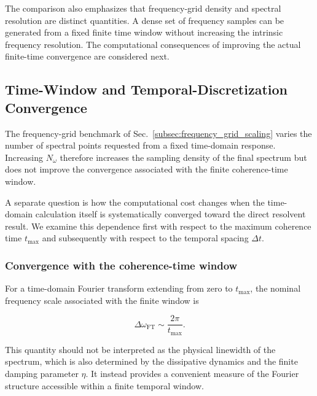 \documentclass[11pt]{article}
\begin{document}
The comparison also emphasizes that frequency-grid density and
spectral resolution are distinct quantities.  A dense set of
frequency samples can be generated from a fixed finite time window
without increasing the intrinsic frequency resolution.  The
computational consequences of improving the actual finite-time
convergence are considered next.

\subsection{Time-Window and Temporal-Discretization Convergence}
\label{subsec:time_window_scaling}

The frequency-grid benchmark of
Sec.~\ref{subsec:frequency_grid_scaling} varies the number of spectral
points requested from a fixed time-domain response.  Increasing
$N_\omega$ therefore increases the sampling density of the final
spectrum but does not improve the convergence associated with the
finite coherence-time window.

A separate question is how the computational cost changes when the
time-domain calculation itself is systematically converged toward the
direct resolvent result.  We examine this dependence first with respect
to the maximum coherence time $t_{\max}$ and subsequently with respect
to the temporal spacing $\Delta t$.

\subsubsection{Convergence with the coherence-time window}
\label{subsubsec:tmax_convergence}

For a time-domain Fourier transform extending from zero to
$t_{\max}$, the nominal frequency scale associated with the finite
window is

\begin{equation}
\Delta\omega_{\mathrm{FT}}
\sim
\frac{2\pi}{t_{\max}}.
\end{equation}

This quantity should not be interpreted as the physical linewidth of
the spectrum, which is also determined by the dissipative dynamics and
the finite damping parameter $\eta$.  It instead provides a convenient
measure of the Fourier structure accessible within a finite temporal
window.
\end{document}
